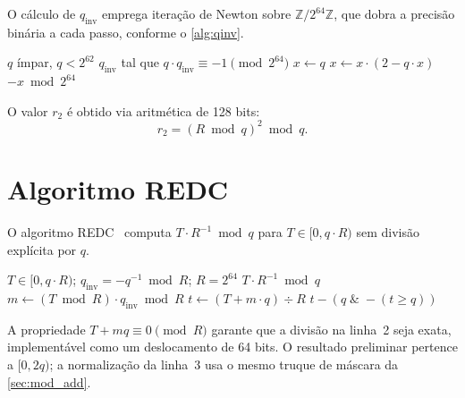 \documentclass[11pt,a4paper]{report}
\begin{document}
O cálculo de $q_{\text{inv}}$ emprega iteração de Newton sobre $\mathbb{Z}/2^{64}\mathbb{Z}$,
que dobra a precisão binária a cada passo, conforme o \cref{alg:qinv}.

\begin{algorithm}[ht]
\caption{Cálculo de $q_{\text{inv}} = -q^{-1} \bmod 2^{64}$ por Newton--Raphson}
\label{alg:qinv}
\begin{algorithmic}[1]
\Require $q$ ímpar, $q < 2^{62}$
\Ensure $q_{\text{inv}}$ tal que $q \cdot q_{\text{inv}} \equiv -1 \pmod{2^{64}}$
\State $x \gets q$
  \State $x \gets x \cdot (2 - q \cdot x)$
\EndFor
\State \Return $-x \bmod 2^{64}$
\end{algorithmic}
\end{algorithm}

O valor $r_2$ é obtido via aritmética de 128 bits:
\begin{equation}
  r_2 = (R \bmod q)^2 \bmod q.
  \label{eq:r2}
\end{equation}

\section{Algoritmo REDC}
\label{sec:redc}

O algoritmo REDC~\cite{Montgomery1985} computa $T \cdot R^{-1} \bmod q$ para
$T \in [0, q \cdot R)$ sem divisão explícita por $q$.

\begin{algorithm}[ht]
\caption{REDC: redução de Montgomery}
\label{alg:redc}
\begin{algorithmic}[1]
\Require $T \in [0, q \cdot R)$;\; $q_{\text{inv}} = -q^{-1} \bmod R$;\; $R = 2^{64}$
\Ensure $T \cdot R^{-1} \bmod q$
\State $m \gets (T \bmod R) \cdot q_{\text{inv}} \bmod R$
\State $t \gets (T + m \cdot q) \div R$
\State \Return $t - (q \;\mathbin{\&}\; -(t \geq q))$
  \Comment{Normaliza $t \in [0, 2q)$ para $[0, q)$ sem desvio}
\end{algorithmic}
\end{algorithm}

A propriedade $T + mq \equiv 0 \pmod{R}$ garante que a divisão na linha~2 seja exata,
implementável como um deslocamento de 64 bits. O resultado preliminar pertence a $[0, 2q)$;
a normalização da linha~3 usa o mesmo truque de máscara da \cref{sec:mod_add}.
\end{document}
